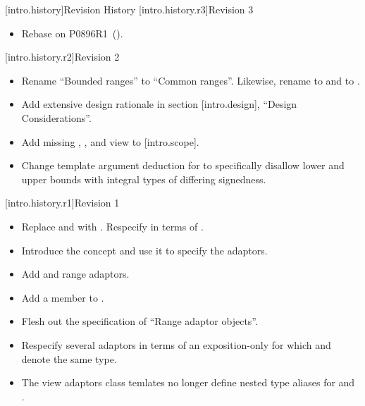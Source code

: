 [intro.history]{Revision History}
[intro.history.r3]{Revision 3}
\begin{itemize}
\item Rebase on P0896R1~(\cite{P0896}).
\end{itemize}

[intro.history.r2]{Revision 2}
\begin{itemize}
\item Rename ``Bounded ranges'' to ``Common ranges''. Likewise, rename
   to  and  to
  .

\item Add extensive design rationale in section [intro.design], ``Design
  Considerations''.

\item Add missing , , and  view to
  [intro.scope].

\item Change template argument deduction for  to specifically
  disallow lower and upper bounds with integral types of differing signedness.
\end{itemize}

[intro.history.r1]{Revision 1}
\begin{itemize}
\item Replace  and  with
  . Respecify  in terms of .

\item Introduce the  concept and use it to specify the
  adaptors.

\item Add  and  range adaptors.

\item Add a  member to .

\item Flesh out the specification of ``Range adaptor objects''.

\item Respecify several adaptors in terms of an exposition-only
   for which  and
   denote the same type.

\item The view adaptors class temlates no longer define nested type
  aliases for  and .
\end{itemize}



